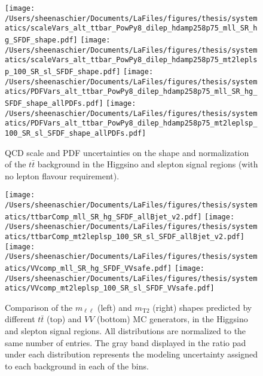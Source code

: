 \documentclass[11pt, oneside]{article}   	%
\begin{document}
  \begin{figure}
  \centering 
   \texttt{[image: /Users/sheenaschier/Documents/LaFiles/figures/thesis/systematics/scaleVars\_alt\_ttbar\_PowPy8\_dilep\_hdamp258p75\_mll\_SR\_hg\_SFDF\_shape.pdf]}
  \texttt{[image: /Users/sheenaschier/Documents/LaFiles/figures/thesis/systematics/scaleVars\_alt\_ttbar\_PowPy8\_dilep\_hdamp258p75\_mt2leplsp\_100\_SR\_sl\_SFDF\_shape.pdf]}
  \texttt{[image: /Users/sheenaschier/Documents/LaFiles/figures/thesis/systematics/PDFVars\_alt\_ttbar\_PowPy8\_dilep\_hdamp258p75\_mll\_SR\_hg\_SFDF\_shape\_allPDFs.pdf]}
  \texttt{[image: /Users/sheenaschier/Documents/LaFiles/figures/thesis/systematics/PDFVars\_alt\_ttbar\_PowPy8\_dilep\_hdamp258p75\_mt2leplsp\_100\_SR\_sl\_SFDF\_shape\_allPDFs.pdf]}
\caption{QCD scale and PDF uncertainties on the shape and normalization of the $t\bar{t}$ background in the Higgsino and slepton signal regions (with no lepton flavour requirement).}
\label{fig:theoryUncsttbar}
 \end{figure}
 
   \begin{figure}
  \centering 
   \texttt{[image: /Users/sheenaschier/Documents/LaFiles/figures/thesis/systematics/ttbarComp\_mll\_SR\_hg\_SFDF\_allBjet\_v2.pdf]}
  \texttt{[image: /Users/sheenaschier/Documents/LaFiles/figures/thesis/systematics/ttbarComp\_mt2leplsp\_100\_SR\_sl\_SFDF\_allBjet\_v2.pdf]}
  \texttt{[image: /Users/sheenaschier/Documents/LaFiles/figures/thesis/systematics/VVcomp\_mll\_SR\_hg\_SFDF\_VVsafe.pdf]}
  \texttt{[image: /Users/sheenaschier/Documents/LaFiles/figures/thesis/systematics/VVcomp\_mt2leplsp\_100\_SR\_sl\_SFDF\_VVsafe.pdf]}
\caption{Comparison of the $m_{\ell\ell}$ (left) and $m_{\text{T}2}$ (right) shapes predicted by different $t\bar{t}$ (top) and $VV$ (bottom) MC generators, in the Higgsino and slepton signal regions. All distributions are normalized to the same number of entries. The gray band displayed in the ratio pad under each distribution represents the modeling uncertainty assigned to each background in each of the bins.}
\label{fig:genComparisonBkgModelling}
 \end{figure}
\FloatBarrier
\clearpage
\end{document}
